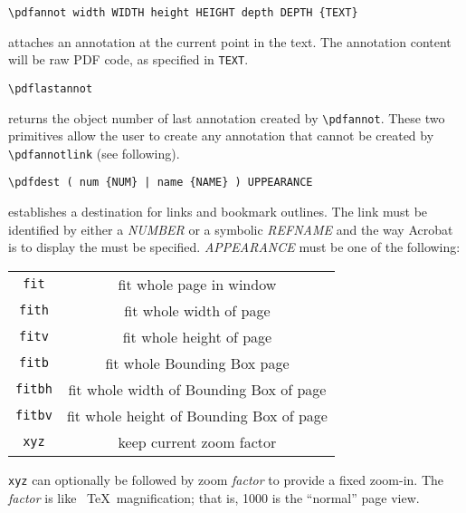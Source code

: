 

\begin{verbatim}
\pdfannot width WIDTH height HEIGHT depth DEPTH {TEXT} 
\end{verbatim}

attaches an annotation at the current point in the text. The annotation content will 
be raw PDF code, as specified in \verb|TEXT|. 

\begin{verbatim}
\pdflastannot 
\end{verbatim}

returns the object number of last annotation created by \verb|\pdfannot|. These two 
primitives allow the user to create any annotation that cannot be created by 
\verb|\pdfannotlink| (see following). 


\begin{verbatim}
\pdfdest ( num {NUM} | name {NAME} ) UPPEARANCE 
\end{verbatim}

establishes a destination for links and bookmark outlines. The link must
be identified by either a \emph{NUMBER} 
or a symbolic \emph{REFNAME} and the way Acrobat is to display the 
must be specified. \emph{APPEARANCE} must be one of the following: 

\begin{center}
  \begin{tabular}{cc}
    \verb|fit|   & fit whole page in window                 \\
    \verb|fith|  & fit whole width of page                  \\
    \verb|fitv|  & fit whole height of page                 \\
    \verb|fitb|  & fit whole Bounding Box page              \\
    \verb|fitbh| & fit whole width of Bounding Box of page  \\
    \verb|fitbv| & fit whole height of Bounding Box of page \\
    \verb|xyz|   & keep current zoom factor                 \\
  \end{tabular}
\end{center}

\verb|xyz| can optionally be followed by zoom \emph{factor} to provide a
fixed zoom-in. The \emph{factor} 
is like \ \TeX\  magnification; that is, 1000 is the ``normal'' page view. 

